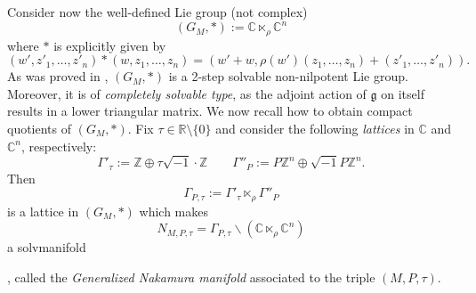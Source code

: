 \documentclass[a4paper, 11pt]{amsart}
\theoremstyle{plain}
\theoremstyle{definition}
\numberwithin{equation}{section}
\begin{document}
{
Consider now the well-defined Lie group (not complex)
\[  (G_{M}, *) := \mathbb{C} \ltimes_{\rho} \mathbb{C}^{n} \]
where $*$ is explicitly given by
\[ (w', z'_{1}, \ldots, z'_{n}) * (w, z_{1}, \ldots, z_{n}) = (w' + w, \rho(w')(z_{1}, \ldots, z_{n}) + (z'_{1}, \ldots, z'_{n})). \]
As was proved in \cite[subsection 4.5]{CT}, $(G_{M}, *)$ is a 2-step solvable non-nilpotent Lie group. Moreover, it is of \textit{completely solvable type}, as the adjoint action of $\mathfrak{g}$ on itself results in a lower triangular matrix.
We now recall how to obtain compact quotients of $(G_{M}, *)$. Fix $\tau \in \mathbb{R} \setminus \{0\}$ and consider the following \textit{lattices} in $\mathbb{C}$ and $\mathbb{C}^{n}$, respectively:
\begin{equation}\label{LatticesInNakamura}
    \Gamma'_{\tau} := \mathbb{Z} \oplus \tau\sqrt{-1}\cdot\mathbb{Z} \qquad
    \Gamma''_{P} := P\mathbb{Z}^{n} \oplus \sqrt{-1}P\mathbb{Z}^{n}.
\end{equation}
Then
\[ \Gamma_{P, \tau} :=  \Gamma'_{\tau} \ltimes_{\rho} \Gamma''_{P}\]
is a lattice in $(G_{M}, *)$ which makes
\begin{equation}\label{DefinizioneGenNakamura}
N_{M, P, \tau} = \Gamma_{P, \tau} \backslash (\mathbb{C} \ltimes_{\rho} \mathbb{C}^{n})
\end{equation}
a solvmanifold}, called the \textit{Generalized Nakamura manifold} associated to the triple $(M, P, \tau)$.
\end{document}
